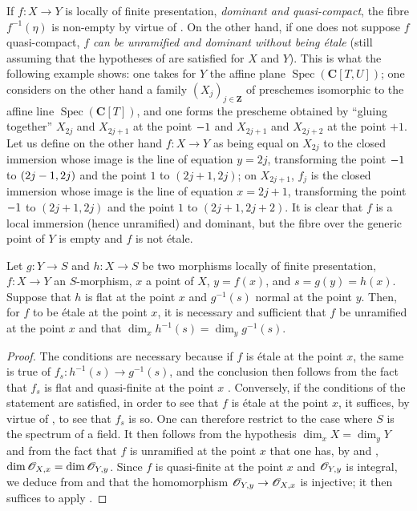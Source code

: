 \begin{remark}[18.10.3.1]
\label{IV.18.10.3.1}
If $f:X\to Y$ is locally of finite presentation, \emph{dominant and quasi-compact}, the fibre $f^{-1}(\eta)$ is non-empty by virtue of .
On the other hand, if one does not suppose $f$ quasi-compact, \emph{$f$ can be unramified and dominant without being \'etale} (still assuming that the hypotheses of  are satisfied for $X$ and $Y$).
This is what the following example shows: one takes for $Y$ the affine plane $\operatorname{Spec}(\mathbf{C}[T,U])$; one considers on the other hand a family $(X_j)_{j\in\mathbf{Z}}$ of preschemes isomorphic to the affine line $\operatorname{Spec}(\mathbf{C}[T])$, and one forms the prescheme obtained by ``gluing together'' $X_{2j}$ and $X_{2j+1}$ at the point $- 1$ and $X_{2j+1}$ and $X_{2j+2}$ at the point $+1$.
Let us define on the other hand $f:X\to Y$ as being equal on $X_{2j}$ to the closed immersion whose image is the line of equation $y=2j$, transforming the point $- 1$ to $(2j- 1,2j)$ and the point $1$ to $(2j+1,2j)$; on $X_{2j+1}$, $f_j$ is the closed immersion whose image is the line of equation $x=2j+1$, transforming the point $- 1$ to $(2j+1,2j)$ and the point $1$ to $(2j+1,2j+2)$.
It is clear that $f$ is a local immersion (hence unramified) and dominant, but the fibre over the generic point of $Y$ is empty and $f$ is not \'etale.
\end{remark}

\begin{corollary}[18.10.4]
\label{IV.18.10.4}
Let $g:Y\to S$ and $h:X\to S$ be two morphisms locally of finite presentation, $f:X\to Y$ an $S$-morphism, $x$ a point of $X$, $y=f(x)$, and $s=g(y)=h(x)$.
Suppose that $h$ is \textup{flat} at the point $x$ and $g^{-1}(s)$ \textup{normal} at the point $y$.
Then, for $f$ to be \'etale at the point $x$, it is necessary and sufficient that $f$ be unramified at the point $x$ and that $\dim_xh^{-1}(s)=\dim_yg^{-1}(s)$.
\end{corollary}

\begin{proof}
The conditions are necessary because if $f$ is \'etale at the point $x$, the same is true of $f_s:h^{-1}(s)\to g^{-1}(s)$, and the conclusion then follows from the fact that $f_s$ is flat and quasi-finite at the point $x$ .
Conversely, if the conditions of the statement are satisfied, in order to see that $f$ is \'etale at the point $x$, it suffices, by virtue of , to see that $f_s$ is so.
One can therefore restrict to the case where $S$ is the spectrum of a field.
It then follows from the hypothesis $\dim_xX=\dim_yY$ and from the fact that $f$ is unramified at the point $x$ that one has, by  and , $\dim\mathscr{O}_{X,x}=\dim\mathscr{O}_{Y,y}$. Since $f$ is quasi-finite at the point $x$ and $\mathscr{O}_{Y,y}$ is integral, we deduce from  and  that the homomorphism $\mathscr{O}_{Y,y}\to\mathscr{O}_{X,x}$ is injective; it then suffices to apply .
\end{proof}


